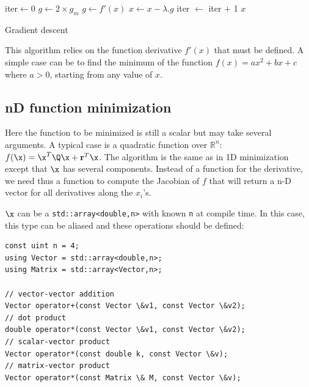 \documentclass{ecnreport}
\begin{document}
\begin{algorithm}[!h]
{}
iter$\gets$0\;
$g\gets2\times g_m$\;
{
$g\gets f'(x)$\;
$x\gets x - \lambda.g$\;
iter $\gets$ iter + 1\;
}
\Return $x$\;
\caption{Gradient descent}
\label{algo:grad}
\end{algorithm}

This algorithm relies on the function derivative $f'(x)$ that must be defined. A simple case can be to find the minimum of the function $f(x) = ax^2+bx+c$ where $a>0$, starting from any value of $x$.

\begin{itemize}
 \end{itemize}
 
\subsection{nD function minimization}

Here the function to be minimized is still a scalar but may take several arguments. A typical case is a quadratic function over $\mathbb{R}^n$: $f(\x) = \x^T\Q\x + \mathbf{r}^T\x$. The algorithm is the same as in 1D minimization except that $\x$ has several components. Instead of a function for the derivative, we need thus a function to compute the Jacobian of $f$ that will return a n-D vector for all derivatives along the $x_i$'s. 

\begin{itemize}
 \end{itemize}

 \newpage
$\x$ can be a \texttt{std::array<double,n>} with known \texttt{n} at compile time. In this case, this type can be aliased and these operations should be defined:
\begin{center}\cppstyle
\begin{lstlisting}
const uint n = 4;
using Vector = std::array<double,n>;
using Matrix = std::array<Vector,n>;

// vector-vector addition
Vector operator+(const Vector \&v1, const Vector \&v2);
// dot product
double operator*(const Vector \&v1, const Vector \&v2);
// scalar-vector product
Vector operator*(const double k, const Vector \&v);
// matrix-vector product
Vector operator*(const Matrix \& M, const Vector \&v);
\end{lstlisting}
\end{center}
\end{document}
